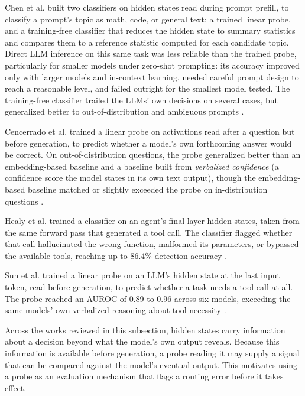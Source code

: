 Chen et al. built two classifiers on hidden states read during prompt prefill, to classify a prompt's topic as math, code, or general text: a trained linear probe, and a training-free classifier that reduces the hidden state to summary statistics and compares them to a reference statistic computed for each candidate topic. Direct LLM inference on this same task was less reliable than the trained probe, particularly for smaller models under zero-shot prompting: its accuracy improved only with larger models and in-context learning, needed careful prompt design to reach a reasonable level, and failed outright for the smallest model tested. The training-free classifier trailed the LLMs' own decisions on several cases, but generalized better to out-of-distribution and ambiguous prompts \cite{chenFastIntentClassification2025}.

Cencerrado et al. trained a linear probe on activations read after a question but before generation, to predict whether a model's own forthcoming answer would be correct. On out-of-distribution questions, the probe generalized better than an embedding-based baseline and a baseline built from \emph{verbalized confidence} (a confidence score the model states in its own text output), though the embedding-based baseline matched or slightly exceeded the probe on in-distribution questions \cite{cencerradoNoAnswerNeeded2026}.

Healy et al. trained a classifier on an agent's final-layer hidden states, taken from the same forward pass that generated a tool call. The classifier flagged whether that call hallucinated the wrong function, malformed its parameters, or bypassed the available tools, reaching up to 86.4\% detection accuracy \cite{healyInternalRepresentationsIndicators2026}.

Sun et al. trained a linear probe on an LLM's hidden state at the last input token, read before generation, to predict whether a task needs a tool call at all. The probe reached an AUROC of 0.89 to 0.96 across six models, exceeding the same models' own verbalized reasoning about tool necessity \cite{sunLLMAgentsAlready2026}.

Across the works reviewed in this subsection, hidden states carry information about a decision beyond what the model's own output reveals. Because this information is available before generation, a probe reading it may supply a signal that can be compared against the model's eventual output. This motivates using a probe as an evaluation mechanism that flags a routing error before it takes effect.

